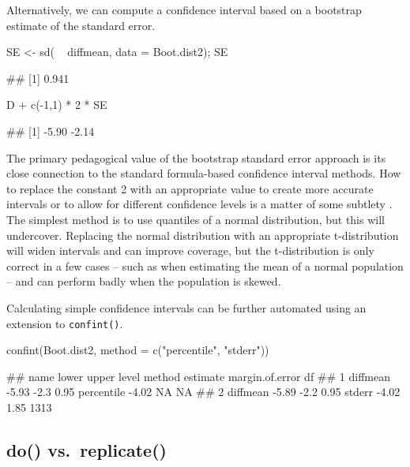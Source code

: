 \noindnet
Alternatively, we can compute a confidence interval based on a bootstrap
estimate of the standard error.

\begin{Schunk}
\begin{Sinput}
SE <- sd( ~ diffmean, data = Boot.dist2); SE
\end{Sinput}
\begin{Soutput}
## [1] 0.941
\end{Soutput}
\begin{Sinput}
D + c(-1,1) * 2 * SE
\end{Sinput}
\begin{Soutput}
## [1] -5.90 -2.14
\end{Soutput}
\end{Schunk}

\noindent
The primary pedagogical value of the bootstrap standard error approach
is its close connection to the standard formula-based confidence
interval methods. How to replace the constant 2 with an appropriate
value to create more accurate intervals or to allow for different
confidence levels is a matter of some subtlety \citep{Hesterberg:2015}.
The simplest method is to use quantiles of a normal distribution, but
this will undercover. Replacing the normal distribution with an
appropriate t-distribution will widen intervals and can improve
coverage, but the t-distribution is only correct in a few cases -- such
as when estimating the mean of a normal population -- and can perform
badly when the population is skewed.

Calculating simple confidence intervals can be further automated using
an extension to \texttt{confint()}.

\begin{Schunk}
\begin{Sinput}
confint(Boot.dist2, method = c("percentile", "stderr"))
\end{Sinput}
\begin{Soutput}
##       name lower upper level     method estimate margin.of.error   df
## 1 diffmean -5.93  -2.3  0.95 percentile    -4.02              NA   NA
## 2 diffmean -5.89  -2.2  0.95     stderr    -4.02            1.85 1313
\end{Soutput}
\end{Schunk}

\subsection{do() vs.~replicate()}\label{do-vs.replicate}

